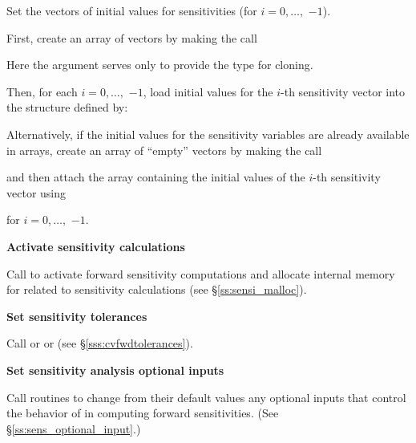 \begin{Steps}
  Set the  vectors  of initial values
  for sensitivities (for $i=0,\ldots,$  $ - 1$). 

  First, create an array of  vectors by making the call

  {\s} 

  {\p} 

  Here the argument  serves only to provide the  type for cloning.

  Then, for each $i = 0,\ldots, $ $ - 1$, load initial values
  for the $i$-th sensitivity vector into the structure defined by:

  {\s} 

  {\p} 

  Alternatively, if the initial values for the sensitivity variables
  are already available in  arrays, create an array of
   ``empty'' vectors by making the call

  {\s} 

  {\p} 

  and then attach the  array  containing the
  initial values of the $i$-th sensitivity vector using

  {\s} 
  
  {\p} 

  for $i = 0,\ldots, $ $ - 1$.
  
\item
  {\bf Activate sensitivity calculations}

  Call \id{(\ldots);} to activate forward 
  sensitivity computations and allocate internal memory for {\cvodes} related 
  to sensitivity calculations (see \S\ref{ss:sensi_malloc}).

\item
  {\bf Set sensitivity tolerances}

  Call  or  or
   (see \S\ref{sss:cvfwdtolerances}).

\item
  {\bf Set sensitivity analysis optional inputs}

  Call  routines to change from their default values any
  optional inputs that control the behavior of {\cvodes} in computing forward 
  sensitivities.  (See \S\ref{ss:sens_optional_input}.)


\end{Steps}
